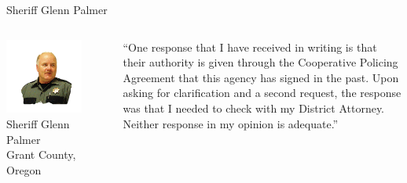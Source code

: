 \begin{frame}{Sheriff Glenn Palmer}
    \begin{columns}[onlytextwidth]
            \centering
            \includegraphics[width=0.75\textwidth]{img/glenn-palmer.png}
            \\ Sheriff Glenn Palmer
            \\ Grant County, Oregon

            ``One response that I have received in writing is that their
            authority is given through the Cooperative Policing Agreement that
            this agency has signed in the past. Upon asking for clarification
            and a second request, the response was that I needed to check with
            my District Attorney. Neither response in my opinion is adequate.''
    \end{columns}
\end{frame}

